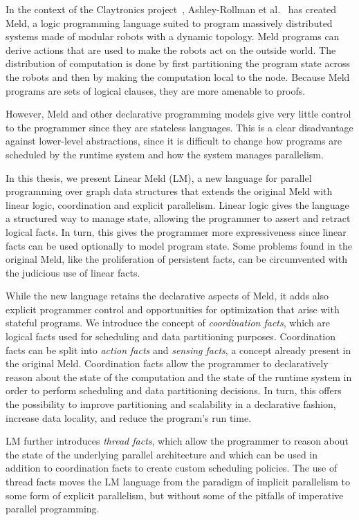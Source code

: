 In the context of the Claytronics project~\cite{goldstein-computer05},
Ashley-Rollman et al.~\cite{ashley-rollman-iclp09,
ashley-rollman-derosa-iros07wksp} has created Meld, a logic programming
language suited to program massively distributed systems made of modular
robots with a dynamic topology.  Meld programs can derive actions that are
used to make the robots act on the outside world. The distribution of
computation is done by first partitioning the program state across the
robots and then by making the computation local to the node. Because Meld
programs are sets of logical clauses, they are more amenable to proofs.

However, Meld and other declarative programming models give very little control
to the programmer since they are stateless languages.  This is a clear
disadvantage against lower-level abstractions, since it is difficult to change
how programs are scheduled by the runtime system and how the system manages
parallelism.

In this thesis, we present Linear Meld (LM), a new language for parallel
programming over graph data structures that extends the original Meld with
linear logic, coordination and explicit parallelism. Linear logic gives the
language a structured way to manage state, allowing the programmer to assert and
retract logical facts. In turn, this gives the programmer more expressiveness
since linear facts can be used optionally to model program state. Some problems
found in the original Meld, like the proliferation of persistent facts, can be
circumvented with the judicious use of linear facts.

While the new language retains the declarative aspects of Meld, it adds also
explicit programmer control and opportunities for optimization that arise with
stateful programs. We introduce the concept of \emph{coordination facts}, which
are logical facts used for scheduling and data partitioning purposes.
Coordination facts can be split into \emph{action facts} and \emph{sensing
facts}, a concept already present in the original Meld. Coordination facts allow
the programmer to declaratively reason about the state of the computation and
the state of the runtime system in order to perform scheduling and data
partitioning decisions. In turn, this offers the possibility to improve
partitioning and scalability in a declarative fashion, increase data locality,
and reduce the program's run time.

LM further introduces \emph{thread facts}, which allow the programmer to reason
about the state of the underlying parallel architecture and which can be used in
addition to coordination facts to create custom scheduling policies. The use of
thread facts moves the LM language from the paradigm of implicit parallelism to
some form of explicit parallelism, but without some of the pitfalls of
imperative parallel programming.

